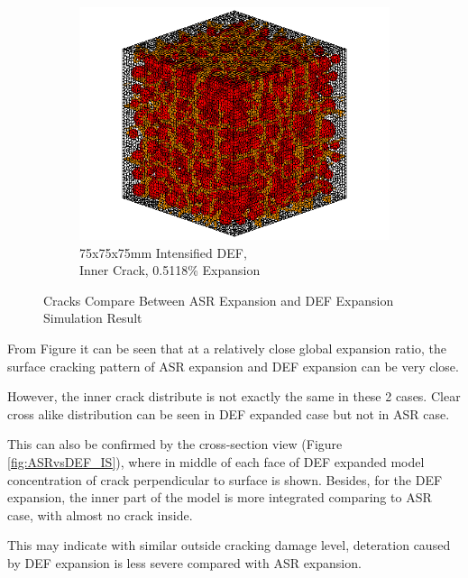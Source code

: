 \begin{figure}[ht]
\begin{subfigure}{.5\textwidth}
        \includegraphics[width=.8\linewidth]{Files/exp_3D/DEF/A30X-5C_3_c.png}
        \caption{75x75x75mm Intensified DEF, \\Inner Crack, 0.5118\% Expansion}
        \end{subfigure}
  \caption{Cracks Compare Between ASR Expansion and DEF Expansion Simulation Result}
  \label{fig:ASRvsDEF_3D}
\end{figure}

From Figure \label{fig:ASRvsDEF_3D} it can be seen that at a relatively close global expansion ratio, the surface cracking pattern of ASR expansion and DEF expansion can be very close.

However, the inner crack distribute is not exactly the same in these 2 cases. Clear cross alike distribution can be seen in DEF expanded case but not in ASR case.

This can also be confirmed by the cross-section view (Figure \ref{fig:ASRvsDEF_IS}), where in middle of each face of DEF expanded model concentration of crack perpendicular to surface is shown. Besides, for the DEF expansion, the inner part of the model is more integrated comparing to ASR case, with almost no crack inside.

This may indicate with similar outside cracking damage level, deteration caused by DEF expansion is less severe compared with ASR expansion.

